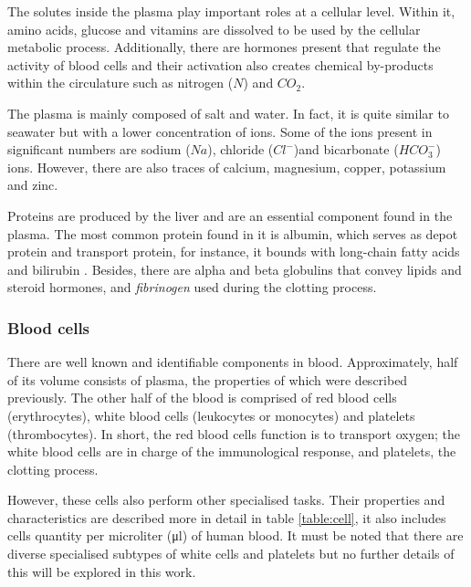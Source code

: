 The solutes inside the plasma play important roles at a cellular level. Within it, amino acids, glucose and vitamins are dissolved to be used by the cellular metabolic process. Additionally, there are hormones present that regulate the activity of blood cells and their activation also creates chemical by-products within the circulature such as nitrogen ($N$) and $CO_2$.

The plasma is mainly composed of salt and water. In fact, it is quite similar to seawater but with a lower concentration of ions. Some of the ions present in significant numbers are sodium ($Na$), chloride ($Cl^-$)and bicarbonate ($HCO_3^-$) ions. However, there are also traces of calcium, magnesium, copper, potassium and zinc.

Proteins are produced by the liver and are an essential component found in the plasma. The most common protein found in it is albumin, which serves as depot protein and transport protein, for instance, it bounds with long-chain fatty acids and bilirubin \cite{kragh1981molecular}. Besides, there are alpha and beta globulins that convey lipids and steroid hormones, and \textit{fibrinogen} used during the clotting process.

\subsubsection{Blood cells}
There are well known and identifiable components in blood. Approximately, half of its volume consists of plasma, the properties of which were described previously. The other half of the blood is comprised of red blood cells (erythrocytes), white blood cells (leukocytes or monocytes) and platelets (thrombocytes). In short, the red blood cells function is to transport oxygen; the white blood cells are in charge of the immunological response, and platelets, the clotting process.

However, these cells also perform other specialised tasks. Their properties and characteristics are described more in detail in table \ref{table:cell}, it also includes cells quantity per microliter (\si{\micro\litre}) of human blood. It must be noted that there are diverse specialised subtypes of white cells and platelets but no further details of this will be explored in this work.

